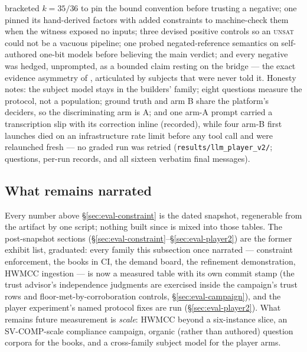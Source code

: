 bracketed $k{=}35/36$ to pin the bound convention before trusting a
negative; one pinned its hand-derived factors with added constraints
to machine-check them when the witness exposed no inputs; three
devised positive controls so an \textsc{unsat} could not be a
vacuous pipeline; one probed negated-reference semantics on
self-authored one-bit models before believing the main verdict; and
every negative was hedged, unprompted, as a bounded claim resting on
the bridge --- the exact evidence asymmetry of
, articulated by subjects that
were never told it. Honesty notes: the subject model stays in the
builders' family; eight questions measure the protocol, not a
population; ground truth and arm B share the platform's deciders, so
the discriminating arm is A; and one arm-A prompt carried a
transcription slip with its correction inline (recorded), while four
arm-B first launches died on an infrastructure rate limit before any
tool call and were relaunched fresh --- no graded run was retried
(\texttt{results/llm\_player\_v2/}; questions, per-run records, and
all sixteen verbatim final messages).

\subsection{What remains narrated}
\label{sec:eval-exhibits}

Every number above \S\ref{sec:eval-constraint} is the dated snapshot,
regenerable from the artifact by one script; nothing built since is
mixed into those tables. The post-snapshot sections
(\S\ref{sec:eval-constraint}--\S\ref{sec:eval-player2}) are the
former exhibit list, graduated: every family this subsection once
narrated --- constraint enforcement, the books in CI, the demand
board, the refinement demonstration, HWMCC ingestion --- is now a
measured table with its own commit stamp (the trust advisor's
independence judgments are exercised inside the campaign's trust rows
and floor-met-by-corroboration controls,
\S\ref{sec:eval-campaign}), and the player experiment's named
protocol fixes are run (\S\ref{sec:eval-player2}). What remains
future measurement is
\emph{scale}: HWMCC beyond a six-instance slice, an SV-COMP-scale
compliance campaign, organic (rather than authored) question
corpora for the books, and a cross-family subject model for the
player arms.
\fi
